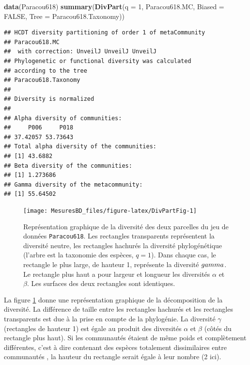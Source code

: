 \documentclass[
  11pt,
  french,
  a4paper,
  extrafontsizes,onecolumn,openright
  ]{memoir}
\newenvironment{Shaded}{\begin{snugshade}}{\end{snugshade}}
\newcommand{\DataTypeTok}[1]{\textcolor[rgb]{0.13,0.29,0.53}{#1}}
\newcommand{\DecValTok}[1]{\textcolor[rgb]{0.00,0.00,0.81}{#1}}
\newcommand{\KeywordTok}[1]{\textcolor[rgb]{0.13,0.29,0.53}{\textbf{#1}}}
\newcommand{\NormalTok}[1]{#1}
\newcommand{\OtherTok}[1]{\textcolor[rgb]{0.56,0.35,0.01}{#1}}
\newlength{\rf}
\begin{document}
\scriptsize

\begin{Shaded}
\begin{Highlighting}[]
\KeywordTok{data}\NormalTok{(Paracou618)}
\KeywordTok{summary}\NormalTok{(}\KeywordTok{DivPart}\NormalTok{(}\DataTypeTok{q =} \DecValTok{1}\NormalTok{, Paracou618.MC, }\DataTypeTok{Biased =} \OtherTok{FALSE}\NormalTok{,}
                \DataTypeTok{Tree =}\NormalTok{ Paracou618.Taxonomy))}
\end{Highlighting}
\end{Shaded}

\begin{verbatim}
## HCDT diversity partitioning of order 1 of metaCommunity 
## Paracou618.MC
##  with correction: UnveilJ UnveilJ UnveilJ
## Phylogenetic or functional diversity was calculated
## according to the tree 
## Paracou618.Taxonomy 
## 
## Diversity is normalized 
## 
## Alpha diversity of communities: 
##     P006     P018 
## 37.42057 53.73643 
## Total alpha diversity of the communities: 
## [1] 43.6882
## Beta diversity of the communities: 
## [1] 1.273686
## Gamma diversity of the metacommunity: 
## [1] 55.64502
\end{verbatim}

\normalsize



\scriptsize

\begin{figure}

{\centering \texttt{[image: MesuresBD\_files/figure-latex/DivPartFig-1]} 

}

\caption{Représentation graphique de la diversité des deux parcelles du jeu de données \texttt{Paracou618}. Les rectangles transparents représentent la diversité neutre, les rectangles hachurés la diversité phylogénétique (l'arbre est la taxonomie des espèces, \(q=1\)). Dans chaque cas, le rectangle le plus large, de hauteur 1, représente la diversité \(\\gamma\). Le rectangle plus haut a pour largeur et longueur les diversités \(\alpha\) et \(\beta\). Les surfaces des deux rectangles sont identiques.}\label{fig:DivPartFig}
\end{figure}

\normalsize

La figure \ref{fig:DivPartFig} donne une représentation graphique de la décomposition de la diversité.
La différence de taille entre les rectangles hachurés et les rectangles transparents est due à la prise en compte de la phylogénie.
La diversité \(\gamma\) (rectangles de hauteur 1) est égale au produit des diversités \(\alpha\) et \(\beta\) (côtés du rectangle plus haut).
Si les communautés étaient de même poids et complètement différentes, c'est à dire contenant des espèces totalement dissimilaires entre communautés \autocite{Pavoine2015a}, la hauteur du rectangle serait égale à leur nombre (2 ici).
\end{document}
